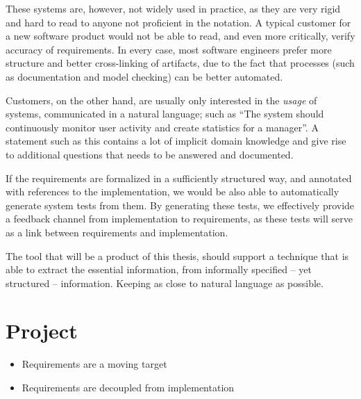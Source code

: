 \noindent These systems are, however, not widely used in practice, as they are very rigid and hard to read to anyone not proficient in the notation. A typical customer for a new software product would not be able to read, and even more critically, verify accuracy of requirements. In every case, most software engineers prefer more structure and better cross-linking of artifacts, due to the fact that processes (such as documentation and model checking) can be better automated.\medskip

\noindent Customers, on the other hand, are usually only interested in the \emph{usage} of systems, communicated in a natural language; such as ``The system should continuously monitor user activity and create statistics for a manager''. A statement such as this contains a lot of implicit domain knowledge and give rise to additional questions that needs to be answered and documented.\medskip

\noindent If the requirements are formalized in a sufficiently structured way, and annotated with references to the implementation, we would be also able to automatically generate system tests from them. By generating these tests, we effectively provide a feedback channel from implementation to requirements, as these tests will serve as a link between requirements and implementation.\medskip

\noindent The tool that will be a product of this thesis, should support a technique that is able to extract the essential information, from informally specified -- yet structured -- information. Keeping as close to natural language as possible.

\section{Project}
\begin{itemize}
  \item Requirements are a moving target
  \item Requirements are decoupled from implementation
\end{itemize}
